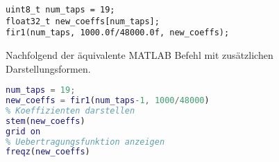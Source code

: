 \begin{lstlisting}[style=Cuvision, caption={Berechnung von 19 Koeffizienten in C}]
uint8_t num_taps = 19;
float32_t new_coeffs[num_taps];
fir1(num_taps, 1000.0f/48000.0f, new_coeffs);
\end{lstlisting}


Nachfolgend der äquivalente MATLAB Befehl mit zusätzlichen Darstellungsformen.\\

\begin{lstlisting}[language=matlab, caption={Berechnung von 19 Koeffizienten in MATLAB}]
num_taps = 19;
new_coeffs = fir1(num_taps-1, 1000/48000)
% Koeffizienten darstellen
stem(new_coeffs)
grid on
% Uebertragungsfunktion anzeigen
freqz(new_coeffs)
\end{lstlisting}



